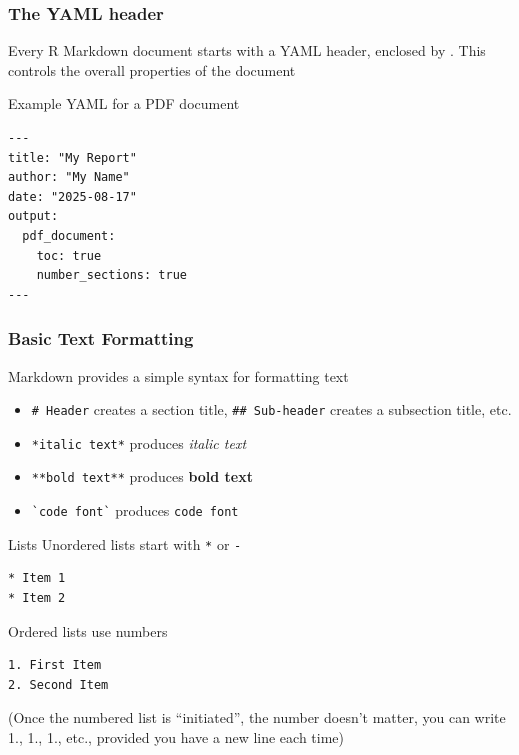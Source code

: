\documentclass[aspectratio=169]{beamer}\usepackage[]{graphicx}\usepackage[]{xcolor}
\begin{document}

\begin{frame}[fragile]
  \frametitle{The YAML header}
Every R Markdown document starts with a YAML header, enclosed by \code{---}. This controls the overall properties of the document
\begin{block}{Example YAML for a PDF document}
\begin{verbatim}
---
title: "My Report"
author: "My Name"
date: "2025-08-17"
output:
  pdf_document:
    toc: true
    number_sections: true
---
\end{verbatim}
\end{block}
\end{frame}


\begin{frame}[fragile]
  \frametitle{Basic Text Formatting}
  Markdown provides a simple syntax for formatting text
  \vfill
  \begin{itemize}
    \item \verb|# Header| creates a section title, \verb|## Sub-header| creates a subsection title, etc.
    \vfill
    \item \verb|*italic text*| produces \textit{italic text}
    \vfill
    \item \verb|**bold text**| produces \textbf{bold text}
    \vfill
    \item \verb|`code font`| produces \texttt{code font}
  \end{itemize}
\end{frame}

\begin{frame}[fragile]{Lists}
Unordered lists start with \verb|*| or \verb|-|
\begin{verbatim}
* Item 1
* Item 2
\end{verbatim}
\vfill
Ordered lists use numbers
\begin{verbatim}
1. First Item
2. Second Item
\end{verbatim}
\vfill
(Once the numbered list is ``initiated'', the number doesn't matter, you can write 1., 1., 1., etc., provided you have a new line each time)
\end{frame}

\end{document}
